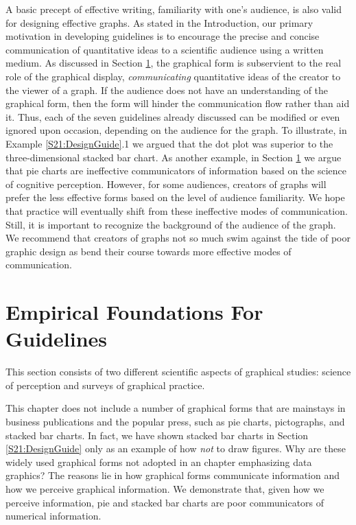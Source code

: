 A basic precept of effective writing, familiarity with one's
audience, is also valid for designing effective graphs. As stated in
the Introduction, our primary motivation in developing guidelines is
to encourage the precise and concise communication of quantitative
ideas to a scientific audience using a written medium. As discussed
in Section \ref{S21:EmpiricalFoundations}, the graphical form is
subservient to the real role of the graphical display,
\emph{communicating} quantitative ideas of the creator to the viewer
of a graph. If the audience does not have an understanding of the
graphical form, then the form will hinder the communication flow
rather than aid it. Thus, each of the seven guidelines already
discussed can be modified or even ignored upon occasion, depending
on the audience for the graph. To illustrate, in Example
\ref{S21:DesignGuide}.1 we argued that the dot plot was superior to
the three-dimensional stacked bar chart. As another example, in
Section \ref{S21:EmpiricalFoundations} we argue that pie charts are
ineffective communicators of information based on the science of
cognitive perception. However, for some audiences, creators of
graphs will prefer the less effective forms based on the level of
audience familiarity. We hope that practice will eventually shift
from these ineffective modes of communication. Still, it is
important to recognize the background of the audience of the graph.
We recommend that creators of graphs not so much swim against the
tide of poor graphic design as bend their course towards more
effective modes of communication.


\section{Empirical Foundations For
Guidelines}\label{S21:EmpiricalFoundations}

This section consists of two different scientific aspects of
graphical studies: science of perception and surveys of graphical
practice.

This chapter does not include a number of graphical forms that are
mainstays in business publications and the popular press, such as
pie charts, pictographs, and stacked bar charts. In fact, we have
shown stacked bar charts in Section \ref{S21:DesignGuide} only as an
example of how \emph{not} to draw figures. Why are these widely used
graphical forms not adopted in an chapter emphasizing data graphics?
The reasons lie in how graphical forms communicate information and
how we perceive graphical information. We demonstrate that, given
how we perceive information, pie and stacked bar charts are poor
communicators of numerical information.

